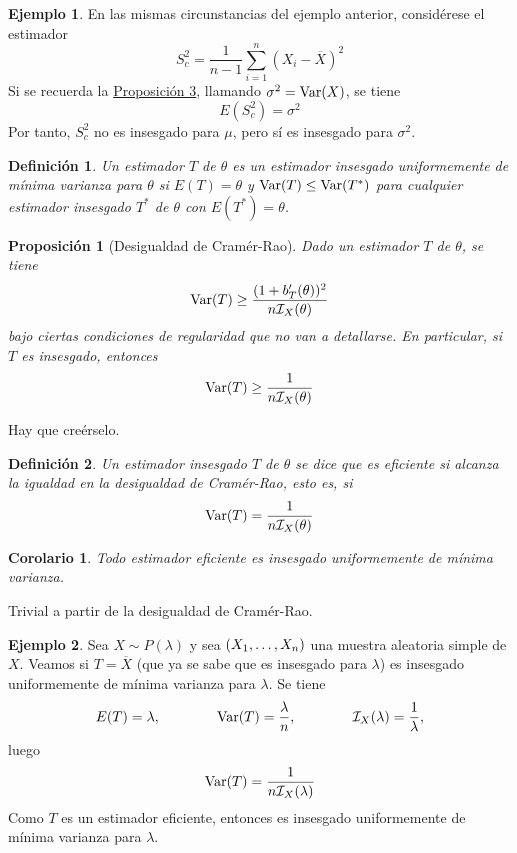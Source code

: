 \documentclass[11pt]{report}
\makeatletter
\renewenvironment{proof}[1][\proofname]{\par
  \pushQED{\qed}%
  \normalfont \topsep\z@skip %
  \trivlist
  \item[\hskip\labelsep
        \itshape
    #1\@addpunct{.}]\ignorespaces
}{%
  \popQED\endtrivlist\@endpefalse
}
\newtheorem{proposition}{Proposición}
\newtheorem{corollary}{Corolario} %
\newtheorem{definition}{Definición}
\theoremstyle{definition}
\newtheorem{example}{Ejemplo}
\makeatother
\begin{document}
\begin{example}
En las mismas circunstancias del ejemplo anterior, considérese el estimador
\[S^2_c=\frac{1}{n-1}\sum_{i=1}^n(X_i-\overline{X})^2\]
Si se recuerda la \hyperref[prop1.12]{\color{blue}Proposición 3}, llamando $\sigma^2 = \textup{Var}(X)$, se tiene
\[E(S^2_c)=\sigma^2\]
Por tanto, $S^2_c$ no es insesgado para $\mu$, pero sí es insesgado para $\sigma^2$.
\end{example}

\begin{definition}
Un estimador $T$ de $\theta$ es un \emph{estimador insesgado uniformemente de mínima varianza para $\theta$} si $E(T) = \theta$ y $\textup{Var}(T)\leq \textup{Var}(T^*)$ para cualquier estimador insesgado $T^*$ de $\theta$ con $E(T^*) = \theta$.
\end{definition}

\begin{proposition}[Desigualdad de Cramér-Rao]
Dado un estimador $T$ de $\theta$, se tiene
\[\textup{Var}(T) \geq \frac{(1+b_T'(\theta))^2}{n\mathcal{I}_X(\theta)}\]
bajo ciertas condiciones de regularidad que no van a detallarse. En particular, si $T$ es insesgado, entonces
\[\textup{Var}(T) \geq \frac{1}{n\mathcal{I}_X(\theta)}\]
\end{proposition}

\begin{proof}
Hay que creérselo.
\end{proof}

\begin{definition}
Un estimador insesgado $T$ de $\theta$ se dice que es \emph{eficiente} si alcanza la igualdad en la desigualdad de Cramér-Rao, esto es, si
\[\textup{Var}(T) = \frac{1}{n\mathcal{I}_X(\theta)}\]
\end{definition}

\begin{corollary}
Todo estimador eficiente es insesgado uniformemente de mínima varianza.
\end{corollary}

\begin{proof}
Trivial a partir de la desigualdad de Cramér-Rao.
\end{proof}

\begin{example}
Sea $X \sim P(\lambda)$ y sea $(X_1,\mathellipsis,X_n)$ una muestra aleatoria simple de $X$. Veamos si $T=\overline{X}$ (que ya se sabe que es insesgado para $\lambda$) es insesgado uniformemente de mínima varianza para $\lambda$. Se tiene
\[E(T) = \lambda, \qquad \qquad \textup{Var}(T) = \frac{\lambda}{n}, \qquad \qquad \mathcal{I}_X(\lambda) = \frac{1}{\lambda},\]
luego
\[\textup{Var}(T) = \frac{1}{n\mathcal{I}_X(\lambda)}\]
Como $T$ es un estimador eficiente, entonces es insesgado uniformemente de mínima varianza para $\lambda$.
\end{example}
\end{document}
